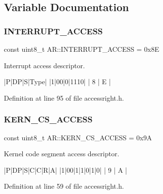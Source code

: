 \subsection{Variable Documentation}
\mbox{\label{namespace_a_r_a22cf15841ad21a98049a02bf139f5d90}} 
\subsubsection{\texorpdfstring{I\+N\+T\+E\+R\+R\+U\+P\+T\+\_\+\+A\+C\+C\+E\+SS}{INTERRUPT\_ACCESS}}
{\footnotesize\ttfamily const uint8\+\_\+t A\+R\+::\+I\+N\+T\+E\+R\+R\+U\+P\+T\+\_\+\+A\+C\+C\+E\+SS = 0x8E}



Interrupt access descriptor. 

\begin{DoxyVerb}|P|DP|S|Type|
|1|00|0|1110|
|   8  |  E |
\end{DoxyVerb}
 

Definition at line 95 of file accessright.\+h.

\mbox{\label{namespace_a_r_a522bab0f6835eb217d6da7dc243cb321}} 
\subsubsection{\texorpdfstring{K\+E\+R\+N\+\_\+\+C\+S\+\_\+\+A\+C\+C\+E\+SS}{KERN\_CS\_ACCESS}}
{\footnotesize\ttfamily const uint8\+\_\+t A\+R\+::\+K\+E\+R\+N\+\_\+\+C\+S\+\_\+\+A\+C\+C\+E\+SS = 0x9A}



Kernel code segment access descriptor. 

\begin{DoxyVerb}|P|DP|S|C|C|R|A|
|1|00|1|1|0|1|0|
|   9  |   A   |
\end{DoxyVerb}
 

Definition at line 59 of file accessright.\+h.

\mbox{\label{namespace_a_r_adc3973813b32aa819be54d431f1bdb24}} 
